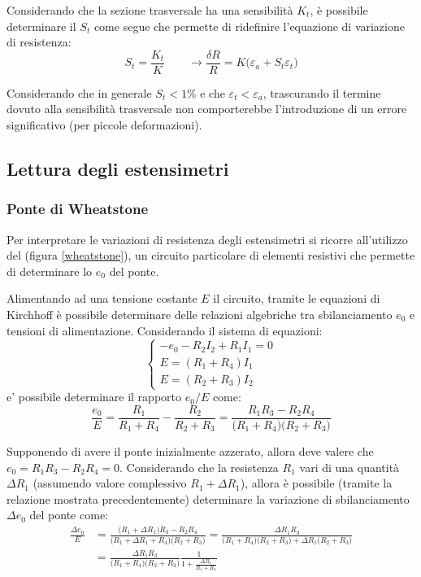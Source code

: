 		Considerando che la sezione trasversale ha una sensibilità $K_t$, è possibile determinare il  $S_t$ come segue che permette di ridefinire l'equazione di variazione di resistenza:
		\[ S_t = \frac{K_t}{K} \qquad \rightarrow \frac {\delta R} R = K\big(\varepsilon_a+ S_t\varepsilon_t\big)  \]
		
		Considerando che in generale $S_t < 1\%$ e che $\varepsilon_t<\varepsilon_a$, trascurando il termine dovuto alla sensibilità trasversale non comporterebbe l'introduzione di un errore significativo (per piccole deformazioni).
		
	\subsection{Lettura degli estensimetri}
	\subsubsection{Ponte di Wheatstone}
		Per interpretare le variazioni di resistenza degli estensimetri si ricorre all'utilizzo del  (figura \ref{wheatstone}), un circuito particolare di elementi resistivi che permette di determinare lo  $e_0$ del ponte.
		
		
		Alimentando ad una tensione costante $E$ il circuito, tramite le equazioni di Kirchhoff è possibile determinare delle relazioni algebriche tra sbilanciamento $e_0$ e tensioni di alimentazione. Considerando il sistema di equazioni:
		\[ \begin{cases}
			-e_0 - R_2I_2 +R_1I_1 = 0 \\ E = (R_1+R_4) I_1 \\ E = (R_2+R_3)I_2
		\end{cases}\]
		e' possibile determinare il rapporto $e_0/E$ come:
		\[ \frac{e_0}{E} = \frac{R_1}{R_1+R_4} - \frac{R_2}{R_2+R_3} = \frac{R_1R_3-R_2R_4}{\big(R_1+R_4\big) \big(R_2+R_3\big)} \]
		
		Supponendo di avere il ponte inizialmente azzerato, allora deve valere che $e_0 = R_1R_3-R_2R_4=0$. Considerando che la resistenza $R_1$ vari di una quantità $\Delta R_1$ (assumendo valore complessivo $R_1+\Delta R_1$), allora è possibile (tramite la relazione mostrata precedentemente) determinare la variazione di sbilanciamento $\Delta e_0$ del ponte come:
		\begin{align*}
			\frac{\Delta e_0}{E} & = \frac{\big(R_1+\Delta R_1\big)R_3-R_2R_4} {\big(R_1+\Delta R_1+R_4\big)\big(R_2+R_3\big)} = \frac{\Delta R_1 R_3}{\big(R_1+R_4\big) \big(R_2+R_3\big) + \Delta R_1 \big(R_2+R_3\big)} \\
			 &= \frac{\Delta R_1 R_3}{\big(R_1+R_4\big) \big(R_2+R_3\big) } \frac{1}{1+\frac{\Delta R_1}{R_1+R_4}}
		\end{align*}
		
